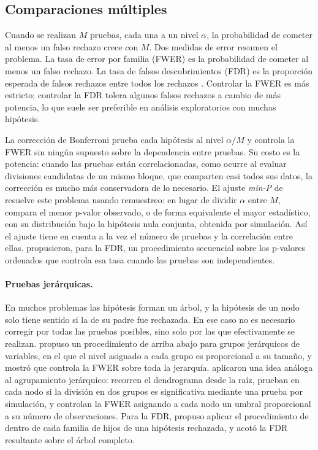 \subsection{Comparaciones múltiples}\label{sec:est-multiplicidad}

Cuando se realizan $M$ pruebas, cada una a un nivel $\alpha$, la probabilidad de
cometer al menos un falso rechazo crece con $M$. Dos medidas de error resumen el
problema. La tasa de error por familia (FWER) es la probabilidad de cometer al
menos un falso rechazo. La tasa de falsos descubrimientos (FDR) es la proporción
esperada de falsos rechazos entre todos los rechazos \cite{Benjamini1995}.
Controlar la FWER es más estricto; controlar la FDR tolera algunos falsos
rechazos a cambio de más potencia, lo que suele ser preferible en análisis
exploratorios con muchas hipótesis.

La corrección de Bonferroni prueba cada hipótesis al nivel $\alpha/M$ y controla la
FWER sin ningún supuesto sobre la dependencia entre pruebas. Su costo es la
potencia: cuando las pruebas están correlacionadas, como ocurre al evaluar
divisiones candidatas de un mismo bloque, que comparten casi todos sus datos, la
corrección es mucho más conservadora de lo necesario. El ajuste \emph{min-P} de
\cite{Westfall1993} resuelve este problema usando remuestreo: en lugar de dividir
$\alpha$ entre $M$, compara el menor p-valor observado, o de forma equivalente el
mayor estadístico, con su distribución bajo la hipótesis nula conjunta, obtenida
por simulación. Así el ajuste tiene en cuenta a la vez el número de pruebas y la
correlación entre ellas. \cite{Benjamini1995} propusieron, para la FDR, un
procedimiento secuencial sobre los p-valores ordenados que controla esa tasa
cuando las pruebas son independientes.

\paragraph{Pruebas jerárquicas.} En muchos problemas las hipótesis forman un
árbol, y la hipótesis de un nodo solo tiene sentido si la de su padre fue
rechazada. En ese caso no es necesario corregir por todas las pruebas posibles,
sino solo por las que efectivamente se realizan. \cite{Meinshausen2008} propuso un
procedimiento de arriba abajo para grupos jerárquicos de variables, en el que el
nivel asignado a cada grupo es proporcional a su tamaño, y mostró que controla la
FWER sobre toda la jerarquía. \cite{Kimes2017} aplicaron una idea análoga al
agrupamiento jerárquico: recorren el dendrograma desde la raíz, prueban en cada
nodo si la división en dos grupos es significativa mediante una prueba por
simulación, y controlan la FWER asignando a cada nodo un umbral proporcional a su
número de observaciones. Para la FDR, \cite{Yekutieli2008} propuso aplicar el
procedimiento de \cite{Benjamini1995} dentro de cada familia de hijos de una
hipótesis rechazada, y acotó la FDR resultante sobre el árbol completo.

